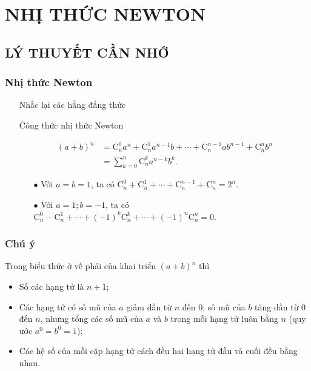 \section{NHỊ THỨC NEWTON}
\subsection{LÝ THUYẾT CẦN NHỚ}
\subsubsection{Nhị thức Newton}
\begin{itemize}
\item [\ding{172}] Nhắc lại các hằng đẳng thức
		\begin{boxkn}
	\end{boxkn}
\item [\ding{173}] Công thức nhị thức Newton
	\begin{boxkn}
		\begin{align*}
		\left(a+b\right)^n &=\mathrm{C}_n^0a^n+\mathrm{C}_n^1{a}^{n-1}b+\cdots+\mathrm{C}_n^{n-1}a{b}^{n-1}+\mathrm{C}_n^nb^n \\ 
		&=\displaystyle \sum\limits_{k=0}^n{\mathrm{C}_n^k{a}^{n-k}b^k.}
		\end{align*}
	\end{boxkn}
	\begin{itemize}
		\item [$\bullet$] Với $a=b=1$, ta có \quad $\mathrm{C}_n^0+\mathrm{C}_n^1+\cdots+\mathrm{C}_n^{n-1}+\mathrm{C}_n^n=2^n$.
		\item [$\bullet$] Với $a=1;  b=-1$, ta có \quad $\mathrm{C}_n^0-\mathrm{C}_n^1+\cdots+{\left(-1\right)}^k\mathrm{C}_n^k+\cdots+{\left(-1\right)}^n\mathrm{C}_n^n=0$.
	\end{itemize}
	\end{itemize}
\subsubsection{Chú ý}
Trong biểu thức ở vế phải của khai triển $\left(a+b\right)^n$ thì
	\begin{itemize}
		\item Số các hạng tử là $n+1$;
		\item Các hạng tử có số mũ của $a$ giảm dần từ $n$ đến $0$; số mũ của $b$ tăng dần từ $0$ đến $n$, nhưng tổng các số mũ của $a$ và $b$ trong mỗi hạng tử luôn bằng $n$ (quy ước $a^0=b^0=1$);
		\item Các hệ số của mỗi cặp hạng tử cách đều hai hạng tử đầu và cuối đều bằng nhau.
	\end{itemize}
